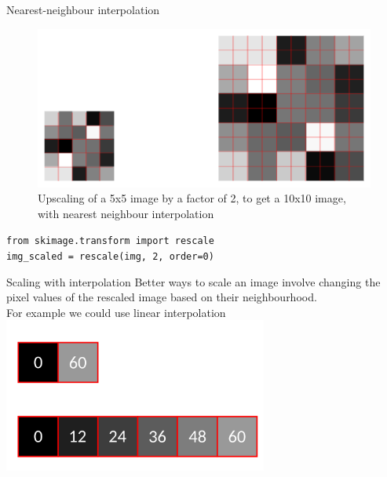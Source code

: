 \documentclass[9pt, aspectratio=169]{beamer}
\begin{document}
\begin{frame}
    {Nearest-neighbour interpolation}
    \begin{figure}
        \centering
        \includegraphics[width=.65\textwidth]{upscaling_no_interpolation.png}
        \caption{Upscaling of a 5x5 image by a factor of 2, to get a 10x10 image, with nearest neighbour interpolation}
    \end{figure}
    \pause
    \begin{codebox}
        \texttt{from skimage.transform import rescale\\
            \texttt{img\_scaled = rescale(}\texttt{img, 2, }order=0)}
    \end{codebox}
\end{frame}

\begin{frame}
    {Scaling with interpolation}
    Better ways to scale an image involve changing the pixel values of the rescaled image based on their neighbourhood.\\
    For example we could use linear interpolation
    \centering
    \includegraphics[width=0.65\textwidth]{1D_lin_interpolation.png}
\end{frame}
\end{document}
